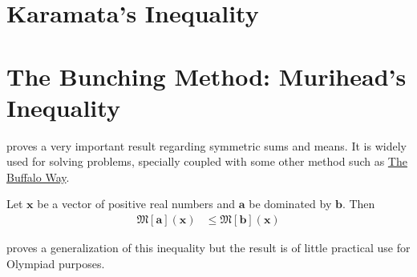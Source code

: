 \documentclass[inequalities.tex]{subfile}
\begin{document}
	\section{Karamata's Inequality}\label{sec:karamata}
	
	\section{The Bunching Method: Murihead's Inequality}\label{sec:bunching}
	
	\textcite{muirhead_1902} proves a very important result regarding symmetric sums and means. It is widely used for solving problems, specially coupled with some other method such as \hyperref[ch:buffalo]{The Buffalo Way}.
		\begin{theorem}
			Let $\mathbf{x}$ be a vector of positive real numbers and $\mathbf{a}$ be dominated by $\mathbf{b}$. Then
				\begin{align*}
					\mathfrak{M}[\mathbf{a}](\mathbf{x})
						& \leq \mathfrak{M}[\mathbf{b}](\mathbf{x})
				\end{align*}
		\end{theorem}
	\textcite{paris_vencovska_2009} proves a generalization of this inequality but the result is of little practical use for Olympiad purposes.
		\begin{theorem}
			
		\end{theorem}
\end{document}
